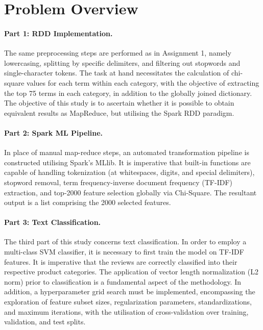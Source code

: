\documentclass[11pt,a4paper]{article}
\begin{document}
\section{Problem Overview}

\paragraph{Part 1: RDD Implementation.} The same preprocessing steps are performed as in Assignment 1, namely lowercasing, splitting by specific delimiters, and filtering out stopwords and single-character tokens. The task at hand necessitates the calculation of chi-square values for each term within each category, with the objective of extracting the top 75 terms in each category, in addition to the globally joined dictionary. The objective of this study is to ascertain whether it is possible to obtain equivalent results as MapReduce, but utilising the Spark RDD paradigm.

\paragraph{Part 2: Spark ML Pipeline.} In place of manual map-reduce steps, an automated transformation pipeline is constructed utilising Spark's MLlib. It is imperative that built-in functions are capable of handling tokenization (at whitespaces, digits, and special delimiters), stopword removal, term frequency-inverse document frequency (TF-IDF) extraction, and top-2000 feature selection globally via Chi-Square. The resultant output is a list comprising the 2000 selected features.

\paragraph{Part 3: Text Classification.} The third part of this study concerns text classification. In order to employ a multi-class SVM classifier, it is necessary to first train the model on TF-IDF features. It is imperative that the reviews are correctly classified into their respective product categories. The application of vector length normalization (L2 norm) prior to classification is a fundamental aspect of the methodology. In addition, a hyperparameter grid search must be implemented, encompassing the exploration of feature subset sizes, regularization parameters, standardizations, and maximum iterations, with the utilisation of cross-validation over training, validation, and test splits.
\end{document}
